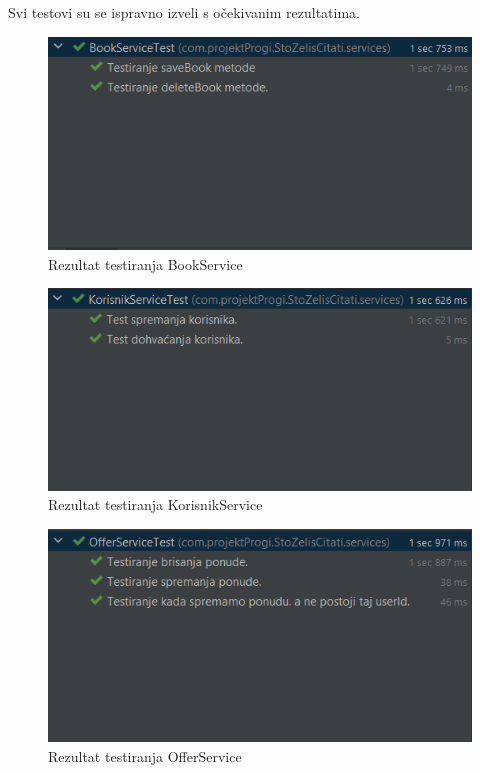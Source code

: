             Svi testovi su se ispravno izveli s očekivanim rezultatima. 
          
			
			
			\begin{figure}[H]
				\includegraphics[width=\textwidth]{slike/UnitTest1.PNG} %
				\centering
				\caption{Rezultat testiranja BookService }
				\label{fig:BookService1}
			\end{figure}
			
			
			
			\begin{figure}[H]
				\includegraphics[width=\textwidth]{slike/UnitTest3.PNG} %
				\centering
				\caption{Rezultat testiranja KorisnikService }
				\label{fig:KorisnikService1}
			\end{figure}
			
			
			
			\begin{figure}[H]
				\includegraphics[width=\textwidth]{slike/UnitTest2.PNG} %
				\centering
				\caption{Rezultat testiranja OfferService}
				\label{fig:OfferService1}
			\end{figure}
			
